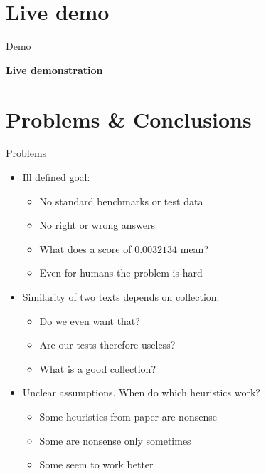 \documentclass[simple]{mybeamer}
\begin{document}
\section{Live demo}

\begin{frame}{Demo}
  \vfill
  
  \begin{center}
    \Large{\textbf{Live demonstration}}
  \end{center}
  
  \vfill
\end{frame}

\section{Problems \& Conclusions}

\begin{frame}{Problems}
    \begin{itemize}
        \item Ill defined goal: %
        \begin{itemize}
            \item No standard benchmarks or test data %
            \item No right or wrong answers
            \item What does a score of $0.0032134$ mean? %
            \item Even for humans the problem is hard %
        \end{itemize}
        \pause
        \item Similarity of two texts depends on collection: %
        \begin{itemize}
            \item Do we even want that? %
            \item Are our tests therefore useless? %
            \item What is a good collection?
        \end{itemize}
        \pause
        \item Unclear assumptions. When do which heuristics work?
        \begin{itemize}
            \item Some heuristics from paper are nonsense
            \item Some are nonsense only sometimes
            \item Some seem to work better
        \end{itemize}
    \end{itemize}
\end{frame}
\end{document}
